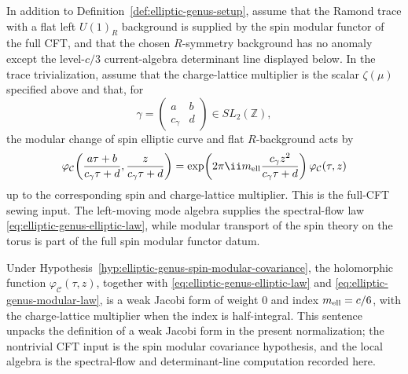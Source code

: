 \begin{hypothesis}
\label{hyp:elliptic-genus-spin-modular-covariance}
In addition to Definition~\ref{def:elliptic-genus-setup}, assume that the
Ramond trace with a flat left \(U(1)_R\) background is supplied by the spin
modular functor of the full CFT, and that the chosen \(R\)-symmetry background
has no anomaly except the level-\(c/3\) current-algebra determinant line
displayed below.  In the trace trivialization, assume that the charge-lattice
multiplier is the scalar \(\zeta(\mu)\) specified above and that, for
\begin{equation}
  \gamma=\begin{pmatrix}a&b\\ c_\gamma&d\end{pmatrix}\in SL_2(\mathbb Z),
  \label{eq:elliptic-genus-modular-matrix}
\end{equation}
the modular change of spin elliptic curve and flat \(R\)-background acts by
\begin{equation}
  \varphi_{\mathcal C}\!\left(
    \frac{a\tau+b}{c_\gamma\tau+d},
    \frac{z}{c_\gamma\tau+d}
  \right)
  =
  \exp\!\left(
    2\pi\ii m_{\rm ell}\frac{c_\gamma z^2}{c_\gamma\tau+d}
  \right)
  \varphi_{\mathcal C}(\tau,z)
  \label{eq:elliptic-genus-modular-law}
\end{equation}
up to the corresponding spin and charge-lattice multiplier.  This is the
full-CFT sewing input.  The left-moving mode algebra supplies the
spectral-flow law \eqref{eq:elliptic-genus-elliptic-law}, while modular
transport of the spin theory on the torus is part of the full spin modular
functor datum.
\end{hypothesis}

Under Hypothesis~\ref{hyp:elliptic-genus-spin-modular-covariance}, the
holomorphic function \(\varphi_{\mathcal C}(\tau,z)\), together with
\eqref{eq:elliptic-genus-elliptic-law} and
\eqref{eq:elliptic-genus-modular-law}, is a weak Jacobi form of weight \(0\)
and index \(m_{\rm ell}=c/6\), with the charge-lattice multiplier when the
index is half-integral.  This sentence unpacks the definition of a weak
Jacobi form in the present normalization; the nontrivial CFT input is the
spin modular covariance hypothesis, and the local algebra is the
spectral-flow and determinant-line computation recorded here.

